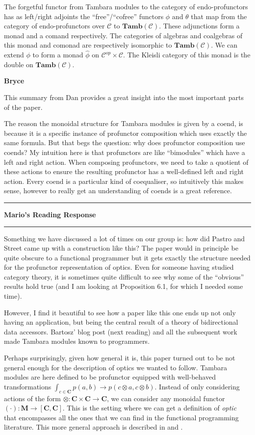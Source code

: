 \documentclass{amsart}
\newcommand{\iam}[1]{
  \vspace{0.25em}
  \hrule
  \vspace{0.25em}
  \textbf{{#1}'s Reading Response}
  \vspace{0.25em}
  \hrule
  \vspace{1em}
}
\newcommand{\respond}[1]{
  \vspace{1em} \textbf{#1}
}
\begin{document}
The forgetful functor from Tambara modules to the category of endo-profunctors has as left/right adjoints the ``free''/``cofree'' functors $\phi$ and $\theta$ that map from the category of endo-profunctors over $\mathcal{C}$ to $\mathbf{Tamb}(\mathcal{C})$. These adjunctions form a monad and a comand respectively.  The categories of algebras and coalgebras of this monad and comonad are respectively isomorphic to $\mathbf{Tamb}(\mathcal{C})$. We can extend $\phi$ to form a monad $\hat{\phi}$ on $\mathcal{C}^{op} \times \mathcal{C}$. The Kleisli category of this monad is the double on $\mathbf{Tamb}(\mathcal{C})$.

\respond{Bryce}
This summary from Dan provides a great insight into the most important parts of the paper.

The reason the monoidal structure for Tambara modules is given by a coend, is because it
is a specific instance of profunctor composition which uses exactly the same formula.
But that begs the question: why does profunctor composition use coends?
My intuition here is that profunctors are like ``bimodules'' which have a left and right
action. When composing profunctors, we need to take a quotient of these actions
to ensure the resulting profunctor has a well-defined left and right action.
Every coend is a particular kind of coequaliser, so intuitively this makes sense,
however to really get an understanding of coends \cite{Fosco} is a great reference.

\iam{Mario}

Something we have discussed a lot of times on our group is: how did
Pastro and Street came up with a construction like this?  The paper
would in principle be quite obscure to a functional programmer but it
gets exactly the structure needed for the profunctor representation of
optics.  Even for someone having studied category theory, it is
sometimes quite difficult to see why some of the ``obvious'' results
hold true (and I am looking at Proposition 6.1, for which I needed
some time).

However, I find it beautiful to see how a paper like this one ends up
not only having an application, but being the central result of a
theory of bidirectional data accessors.  Bartosz' blog post (next
reading) and all the subsequent work made Tambara modules known to
programmers.

Perhaps surprisingly, given how general it is, this paper turned out
to be not general enough for the description of optics we wanted to follow.
Tambara modules are here defined to be profunctor equipped with well-behaved
transformations $\int_{c \in \mathbf{C}} p(a,b) \to p(c \otimes a , c \otimes b)$.
Instead of only considering actions of the form $\otimes \colon \mathbf{C} \times \mathbf{C} \to \mathbf{C}$,
we can consider any monoidal functor $(\cdot) \colon \mathbf{M} \to [ \mathbf{C} , \mathbf{C} ]$.
This is the setting where we can get a definition of \emph{optic} that encompasses
all the ones that we can find in the functional programming literature.
This more general approach is described in \cite{categoriesOfOptics} and
\cite{yonedaKnow}.
\end{document}
